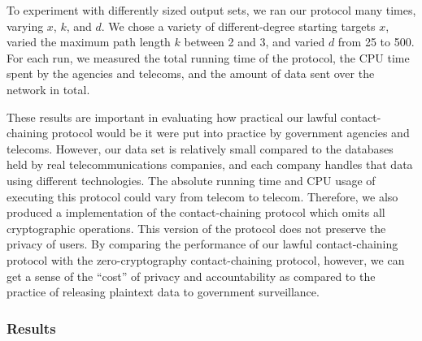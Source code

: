 To experiment with differently sized output sets, we ran our protocol many times, varying $x$, $k$, and $d$. We chose a variety of different-degree starting targets $x$, varied the maximum path length $k$ between 2 and 3, and varied $d$ from 25 to 500. For each run, we measured the total running time of the protocol, the CPU time spent by the agencies and telecoms, and the amount of data sent over the network in total. 



These results are important in evaluating how practical our lawful contact-chaining protocol would be it were put into practice by government agencies and telecoms. However, our data set is relatively small compared to the databases held by real telecommunications companies, and each company handles that data using different technologies. The absolute running time and CPU usage of executing this protocol could vary from telecom to telecom. Therefore, we also produced a implementation of the contact-chaining protocol which omits all cryptographic operations. This version of the protocol does not preserve the privacy of users. By comparing the performance of our lawful contact-chaining protocol with the zero-cryptography contact-chaining protocol, however, we can get a sense of the ``cost'' of privacy and accountability as compared to the practice of releasing plaintext data to government surveillance.



\subsubsection{Results}

